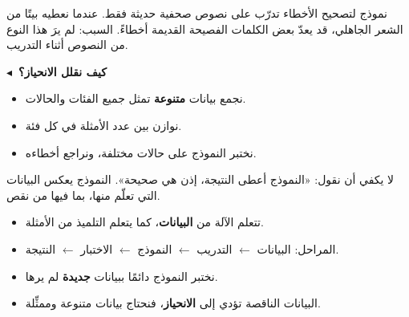 \documentclass[a4paper]{article}
\newcommand{\far}[1]{\par\smallskip
    {\color{dakin}\khatt\bfseries {\color{asasi}$\blacktriangleleft$}\ #1}\par\nopagebreak[4]}
\begin{document}
\begin{arabiyya}
نموذج لتصحيح الأخطاء تدرّب على نصوص صحفية حديثة فقط.
عندما نعطيه بيتًا من الشعر الجاهلي، قد يعدّ بعض الكلمات الفصيحة القديمة أخطاءً.
السبب: لم يرَ هذا النوع من النصوص أثناء التدريب.
\end{arabiyya}

\far{كيف نقلل الانحياز؟}
\begin{itemize}
    \item نجمع بيانات \textbf{متنوعة} تمثل جميع الفئات والحالات.
    \item نوازن بين عدد الأمثلة في كل فئة.
    \item نختبر النموذج على حالات مختلفة، ونراجع أخطاءه.
\end{itemize}

\begin{intabih}
لا يكفي أن نقول: «النموذج أعطى النتيجة، إذن هي صحيحة».
النموذج يعكس البيانات التي تعلّم منها، بما فيها من نقص.
\end{intabih}

\begin{khulasa}
\begin{itemize}
    \item تتعلم الآلة من \textbf{البيانات}، كما يتعلم التلميذ من الأمثلة.
    \item المراحل: البيانات $\leftarrow$ التدريب $\leftarrow$ النموذج
          $\leftarrow$ الاختبار $\leftarrow$ النتيجة.
    \item نختبر النموذج دائمًا ببيانات \textbf{جديدة} لم يرها.
    \item البيانات الناقصة تؤدي إلى \textbf{الانحياز}، فنحتاج بيانات متنوعة وممثِّلة.
\end{itemize}
\end{khulasa}
\end{document}
